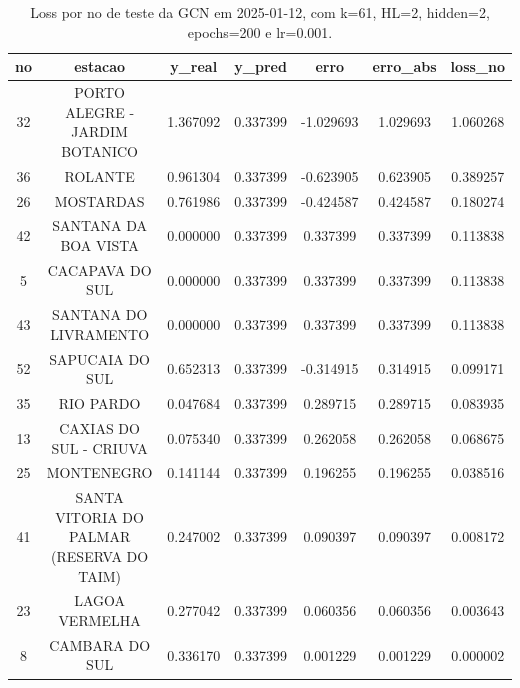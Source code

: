 \begin{table}[h]
\centering
\caption{Loss por no de teste da GCN em 2025-01-12, com k=61, HL=2, hidden=2, epochs=200 e lr=0.001.}
\label{tab:gcn_loss_k61_hl2_h2_e200_d20250112}
\begin{tabular}{ccccccc}
\toprule
no & estacao & y\_real & y\_pred & erro & erro\_abs & loss\_no \\
\midrule
32 & PORTO ALEGRE - JARDIM BOTANICO & 1.367092 & 0.337399 & -1.029693 & 1.029693 & 1.060268 \\
36 & ROLANTE & 0.961304 & 0.337399 & -0.623905 & 0.623905 & 0.389257 \\
26 & MOSTARDAS & 0.761986 & 0.337399 & -0.424587 & 0.424587 & 0.180274 \\
42 & SANTANA DA BOA VISTA & 0.000000 & 0.337399 & 0.337399 & 0.337399 & 0.113838 \\
5 & CACAPAVA DO SUL & 0.000000 & 0.337399 & 0.337399 & 0.337399 & 0.113838 \\
43 & SANTANA DO LIVRAMENTO & 0.000000 & 0.337399 & 0.337399 & 0.337399 & 0.113838 \\
52 & SAPUCAIA DO SUL & 0.652313 & 0.337399 & -0.314915 & 0.314915 & 0.099171 \\
35 & RIO PARDO & 0.047684 & 0.337399 & 0.289715 & 0.289715 & 0.083935 \\
13 & CAXIAS DO SUL - CRIUVA & 0.075340 & 0.337399 & 0.262058 & 0.262058 & 0.068675 \\
25 & MONTENEGRO & 0.141144 & 0.337399 & 0.196255 & 0.196255 & 0.038516 \\
41 & SANTA VITORIA DO PALMAR (RESERVA DO TAIM) & 0.247002 & 0.337399 & 0.090397 & 0.090397 & 0.008172 \\
23 & LAGOA VERMELHA & 0.277042 & 0.337399 & 0.060356 & 0.060356 & 0.003643 \\
8 & CAMBARA DO SUL & 0.336170 & 0.337399 & 0.001229 & 0.001229 & 0.000002 \\
\bottomrule
\end{tabular}
\end{table}
